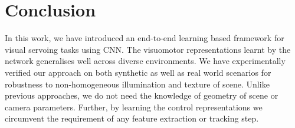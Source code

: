 \documentclass[usletter, 10 pt, conference]{ieeeconf}  %
\begin{document}
\section{Conclusion}
In this work, we have introduced an end-to-end learning based framework for visual servoing tasks using CNN. The visuomotor representations learnt by the network generalises well across diverse environments. We have experimentally verified our approach on both synthetic as well as real world scenarios for robustness to non-homogeneous illumination and texture of scene. Unlike previous approaches, we do not need the knowledge of geometry of scene or camera parameters. Further, by learning the control representations we circumvent the requirement of any feature extraction or tracking step.


\end{document}
